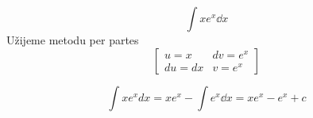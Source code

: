 \begin{mdframed}[style=mdexam]
  \begin{example}\label{mai:exam112}
    \begin{equation}\label{mai:exam016_001}
      \int{xe^x\dd{x}}
    \end{equation}
    Užijeme metodu per partes 
    \begin{equation*}
      \left[
        \begin{array}{cc}
          u=x   & dv=e^x \\
          du=dx & v=e^x
        \end{array}
      \right] 
    \end{equation*}

    \begin{equation*}
      \int{xe^xdx} = xe^x-\int{e^x\dd{x}} = xe^x - e^x+ c
    \end{equation*}
  \end{example}
\end{mdframed}